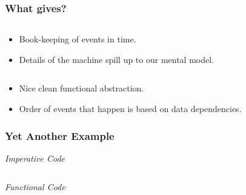 \documentclass{beamer}
\begin{document}
\begin{frame}[fragile,t]
  \frametitle{What gives?}

  \begin{multicols}{2}

    \inputminted[fontsize=\tiny]{c}{code/slides/sumfive.c}

    \begin{itemize}
    \item Book-keeping of events in time.
    \item Details of the machine spill up to our mental model.
    \end{itemize}

    \columnbreak

    \inputminted[fontsize=\tiny]{haskell}{code/slides/SumFiveShort.hs}

    \begin{itemize}
    \item Nice clean functional abstraction.
    \item Order of events that happen is based on data dependencies.
    \end{itemize}

  \end{multicols}

\end{frame}

\begin{frame}[fragile,t]
  \frametitle{Yet Another Example}

  \emph{Imperative Code}
  \inputminted[frame=bottomline,fontsize=\footnotesize]{c}{code/slides/primes.c}

  \vfill

  \emph{Functional Code}
  \inputminted[frame=bottomline,fontsize=\footnotesize]{haskell}{code/slides/Primes.hs}

\end{frame}
\end{document}
